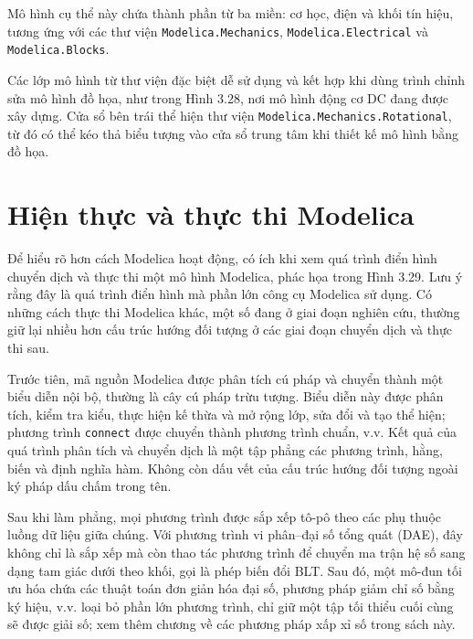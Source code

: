 Mô hình cụ thể này chứa thành phần từ ba miền: cơ học, điện và khối tín hiệu, tương ứng với các thư viện \texttt{Modelica.Mechanics}, \texttt{Modelica.Electrical} và \texttt{Modelica.Blocks}.

Các lớp mô hình từ thư viện đặc biệt dễ sử dụng và kết hợp khi dùng trình chỉnh sửa mô hình đồ họa, như trong Hình 3.28, nơi mô hình động cơ DC đang được xây dựng. Cửa sổ bên trái thể hiện thư viện \texttt{Modelica.Mechanics.Rotational}, từ đó có thể kéo thả biểu tượng vào cửa sổ trung tâm khi thiết kế mô hình bằng đồ họa.

\section{Hiện thực và thực thi Modelica}
Để hiểu rõ hơn cách Modelica hoạt động, có ích khi xem quá trình điển hình chuyển dịch và thực thi một mô hình Modelica, phác họa trong Hình 3.29. Lưu ý rằng đây là quá trình điển hình mà phần lớn công cụ Modelica sử dụng. Có những cách thực thi Modelica khác, một số
đang ở giai đoạn nghiên cứu, thường giữ lại nhiều hơn cấu trúc hướng đối tượng ở các giai đoạn chuyển dịch và thực thi sau.

Trước tiên, mã nguồn Modelica được phân tích cú pháp và chuyển thành một biểu diễn nội bộ, thường là cây cú pháp trừu tượng. Biểu diễn này được phân tích, kiểm tra kiểu, thực hiện kế thừa và mở rộng lớp, sửa đổi và tạo thể hiện; phương trình \texttt{connect} được chuyển thành phương trình chuẩn, v.v. Kết quả của quá trình phân tích và chuyển dịch là một tập phẳng các phương trình, hằng, biến và định nghĩa hàm. Không còn dấu vết của cấu trúc hướng đối tượng ngoài ký pháp dấu chấm trong tên.

Sau khi làm phẳng, mọi phương trình được sắp xếp tô-pô theo các phụ thuộc luồng dữ liệu giữa chúng. Với phương trình vi phân--đại số tổng quát (DAE), đây không chỉ là sắp xếp mà còn thao tác phương trình để chuyển ma trận hệ số sang dạng tam giác dưới theo khối, gọi là phép biến đổi BLT. Sau đó, một mô-đun tối ưu hóa chứa các thuật toán đơn giản hóa đại số, phương pháp giảm chỉ số bằng ký hiệu, v.v. loại bỏ phần lớn phương trình, chỉ giữ một tập tối thiểu cuối cùng sẽ được giải số; xem thêm chương về các phương pháp xấp xỉ số trong sách này.

